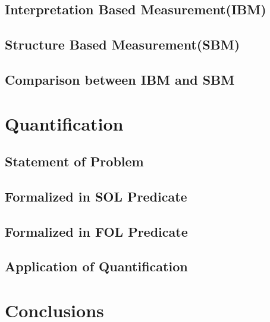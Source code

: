 \documentclass{beamer}
\begin{document}
\subsection{Interpretation Based Measurement(IBM)}
\begin{frame}
\end{frame}

\subsection{Structure Based Measurement(SBM)}
\begin{frame}
\end{frame}

\subsection{Comparison between IBM and SBM}
\begin{frame}
\end{frame}

\section{Quantification}

\subsection{Statement of Problem}
\begin{frame}
\end{frame}

\subsection{Formalized in SOL Predicate}
\begin{frame}
\end{frame}

\subsection{Formalized in FOL Predicate}
\begin{frame}
\end{frame}

\subsection{Application of Quantification}
\begin{frame}
\end{frame}

\section{Conclusions}
\begin{frame}
\end{frame}
\end{document}
